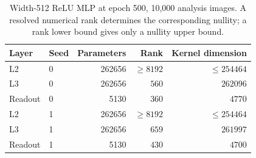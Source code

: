 \begin{table}[!htbp]\centering
\caption{Width-512 ReLU MLP at epoch 500, 10,000 analysis images. A resolved numerical rank determines the corresponding nullity; a rank lower bound gives only a nullity upper bound.}\label{tab:c-wide-ranks}
\small\begin{tabular}{llrrr}\toprule
Layer & Seed & Parameters & Rank & Kernel dimension\\\midrule
L2 & 0 & 262656 & $\ge8192$ & $\le254464$\\
L3 & 0 & 262656 & $560$ & $262096$\\
Readout & 0 & 5130 & $360$ & $4770$\\
L2 & 1 & 262656 & $\ge8192$ & $\le254464$\\
L3 & 1 & 262656 & $659$ & $261997$\\
Readout & 1 & 5130 & $430$ & $4700$\\
\bottomrule\end{tabular}\end{table}
\FloatBarrier